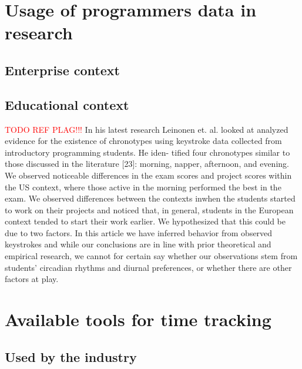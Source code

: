 \section{Usage of programmers data in research}


\subsection{Enterprise context}

\subsection{Educational context}

\textcolor{red}{TODO REF PLAG!!!}
In his latest research Leinonen et. al. \cite{lei21} looked at analyzed evidence for the existence of chronotypes using keystroke data collected from introductory programming students. He iden-
tified four chronotypes similar to those discussed in the
literature [23]: morning, napper, afternoon, and evening.
We observed noticeable differences
in the exam scores and project scores within the US context,
where those active in the morning performed the best in the
exam.
We observed differences between the contexts inwhen the students started to work on their projects and noticed
that, in general, students in the European context tended to
start their work earlier. We hypothesized that this could be
due to two factors.
In this article we have inferred behavior from observed
keystrokes and while our conclusions are in line with prior
theoretical and empirical research, we cannot for certain
say whether our observations stem from students’ circadian
rhythms and diurnal preferences, or whether there are other
factors at play.

\section{Available tools for time tracking}
\subsection{Used by the industry}
